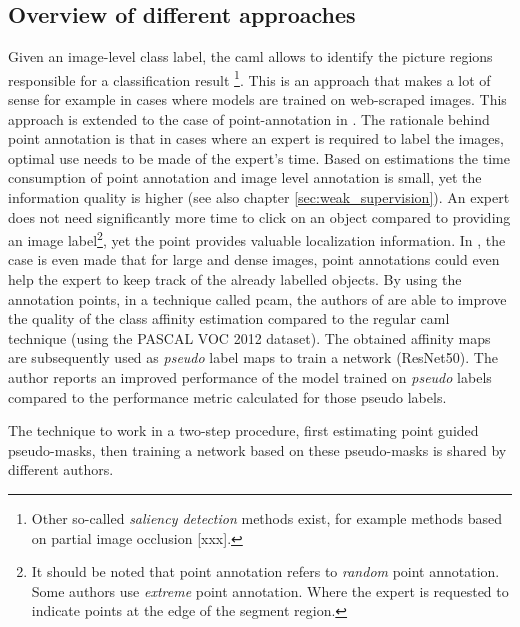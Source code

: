 \subsection{Overview of different approaches}
\par{
    Given an image-level class label, the \Gls{caml}  allows to identify the picture regions responsible for a classification result \cite{Ahn2018, Ahn2019}
    \footnote{Other so-called \textit{saliency detection} methods exist, for example methods based on partial image occlusion [xxx].}.
    This is an approach that makes a lot of sense for example in cases where models are trained on web-scraped images.
    This approach is extended to the case of point-annotation in \cite{McEver2020}. 
    The rationale behind point annotation is that in cases where an expert is required to label the images, optimal use needs to be made of the expert's time.
    Based on estimations \cite{Bearman2015} the time consumption of point annotation and image level annotation is small, yet the information quality is higher (see also chapter \ref{sec:weak_supervision}).
    An expert does not need significantly more time to click on an object compared to providing an image label\footnote{
        It should be noted that point annotation refers to \textit{random} point annotation. Some authors \cite{Mainis} use \textit{extreme} point annotation. 
        Where the expert  is requested to indicate points at the edge of the segment region.
    }, yet the point provides valuable localization information.
    In \cite{McEver2020}, the case is even made that for large and dense images, point annotations could even help the expert to keep track of the already labelled objects.
    By using the annotation points, in a technique called \acrfull{pcam}, the authors of \cite{McEver2020} are able to improve the quality of the class affinity estimation compared to the regular \Gls{caml} technique (using the PASCAL VOC 2012 dataset).
    The obtained affinity maps are subsequently used as \textit{pseudo} label maps to train a network (ResNet50). 
    The author reports an improved performance of the model trained on \textit{pseudo} labels compared to the performance metric calculated for those pseudo labels.
}
\par{
    The technique to work in a two-step procedure, first estimating point guided pseudo-masks, then training a network based on these pseudo-masks is shared by different authors.
}
